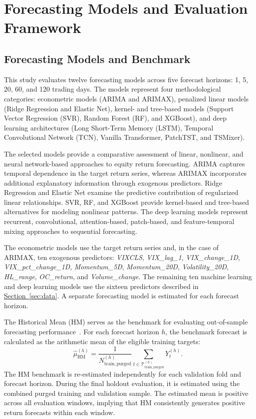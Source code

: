 \documentclass[runningheads,orivec]{llncs}
\begin{document}
\section{Forecasting Models and Evaluation Framework}\label{sec:methodology}

\subsection{Forecasting Models and Benchmark}\label{subsec:models_benchmark}

This study evaluates twelve forecasting models across five forecast horizons: 1, 5, 20, 60, and 120 trading days. The models represent four methodological categories: econometric models (ARIMA and ARIMAX), penalized linear models (Ridge Regression and Elastic Net), kernel- and tree-based models (Support Vector Regression (SVR), Random Forest (RF), and XGBoost), and deep learning architectures (Long Short-Term Memory (LSTM), Temporal Convolutional Network (TCN), Vanilla Transformer, PatchTST, and TSMixer).

The selected models provide a comparative assessment of linear, nonlinear, and neural network-based approaches to equity return forecasting. ARIMA captures temporal dependence in the target return series, whereas ARIMAX incorporates additional explanatory information through exogenous predictors. Ridge Regression and Elastic Net examine the predictive contribution of regularized linear relationships. SVR, RF, and XGBoost provide kernel-based and tree-based alternatives for modeling nonlinear patterns. The deep learning models represent recurrent, convolutional, attention-based, patch-based, and feature-temporal mixing approaches to sequential forecasting.

The econometric models use the target return series and, in the case of ARIMAX, ten exogenous predictors: \textit{VIXCLS}, \textit{VIX\_lag\_1}, \textit{VIX\_change\_1D}, \textit{VIX\_pct\_change\_1D}, \textit{Momentum\_5D}, \textit{Momentum\_20D}, \textit{Volatility\_20D}, \textit{HL\_range}, \textit{OC\_return}, and \textit{Volume\_change}. The remaining ten machine learning and deep learning models use the sixteen predictors described in \hyperref[sec:data]{Section~\ref*{sec:data}}. A separate forecasting model is estimated for each forecast horizon.

The Historical Mean (HM) serves as the benchmark for evaluating out-of-sample forecasting performance~\cite{welch2008}. For each forecast horizon $h$, the benchmark forecast is calculated as the arithmetic mean of the eligible training targets:
\begin{equation}\label{eq:historical_mean}
\widehat{\mu}_{\mathrm{HM}}^{(h)}
=
\frac{1}{N_{\mathrm{train,purged}}^{(h)}}
\sum_{t\in \mathcal{T}_{\mathrm{train,purged}}^{(h)}}
Y_t^{(h)}.
\end{equation}
The HM benchmark is re-estimated independently for each validation fold and forecast horizon. During the final holdout evaluation, it is estimated using the combined purged training and validation sample. The estimated mean is positive across all evaluation windows, implying that HM consistently generates positive return forecasts within each window.
\end{document}
